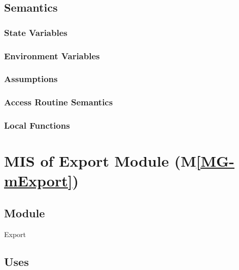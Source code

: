 \documentclass[12pt, titlepage]{article}
\newcommand{\mref}[1]{M\ref{MG-#1}}
\begin{document}
\subsection{Semantics}

\subsubsection{State Variables}


\subsubsection{Environment Variables}


\subsubsection{Assumptions}


\subsubsection{Access Routine Semantics}

\subsubsection{Local Functions}

\newpage


\section{MIS of Export Module (\mref{mExport})} \label{mis-mExport}

\subsection{Module}

Export

\subsection{Uses}
\end{document}
